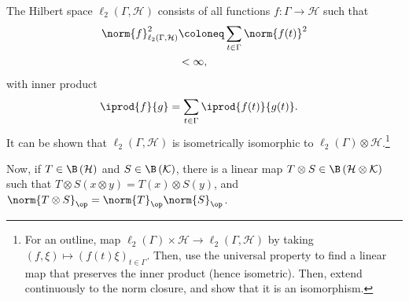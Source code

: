 The Hilbert space $\ell_2\left( \Gamma,\mathcal{H} \right)$ consists of all functions $f\colon \Gamma\rightarrow \mathcal{H}$ such that
\begin{align*}
  \norm{f}_{\ell_2\left( \Gamma,\mathcal{H} \right)}^2 &\coloneq \sum_{t\in\Gamma}\norm{f(t)}^2\\
                                                       &< \infty,
\end{align*}
with inner product
\begin{align*}
  \iprod{f}{g} &= \sum_{t\in\Gamma} \iprod{f(t)}{g(t)}.
\end{align*}
It can be shown that $\ell_2\left( \Gamma,\mathcal{H} \right)$ is isometrically isomorphic to $\ell_2\left( \Gamma \right)\otimes \mathcal{H}$.\footnote{For an outline, map $\ell_2\left( \Gamma \right)\times \mathcal{H}\rightarrow \ell_2\left( \Gamma,\mathcal{H} \right)$ by taking $\left( f,\xi \right)\mapsto \left( f(t)\xi \right)_{t\in\Gamma}$. Then, use the universal property to find a linear map that preserves the inner product (hence isometric). Then, extend continuously to the norm closure, and show that it is an isomorphism.}\newline

Now, if $T\in \B\left( \mathcal{H} \right)$ and $S\in \B\left( \mathcal{K} \right)$, there is a linear map $T\otimes S\in \B\left( \mathcal{H}\otimes \mathcal{K} \right)$ such that $T\otimes S \left( x\otimes y \right) = T(x)\otimes S(y)$, and $\norm{T\otimes S}_{\op} = \norm{T}_{\op}\norm{S}_{\op}$.\newline

